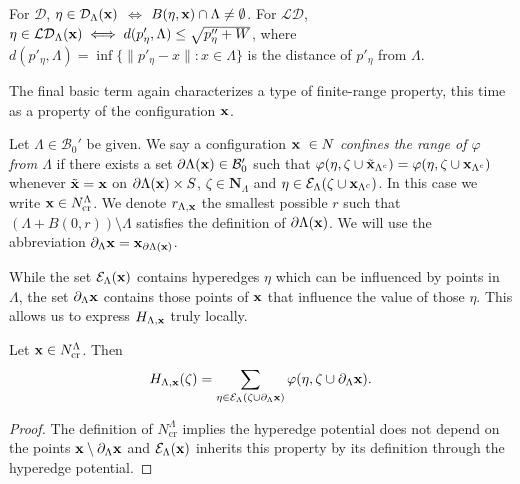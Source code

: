 
\begin{remark}
For $\mathcal D$, $\eta \in \mathcal D_\Lambda({\mathbf{x}})$ $\iff$ $B(\eta,{\mathbf{x}}) \cap \Lambda \neq \emptyset$. \newline
For $\mathcal {LD}$, $\eta \in \mathcal {LD}_\Lambda({\mathbf{x}}) \iff d(p'_\eta,\Lambda) \leq \sqrt{p''_\eta + W}$, where $d(p'_\eta,\Lambda) = \inf\{\|p'_\eta - x\|: x \in \Lambda\}$ is the distance of $p'_\eta$ from $\Lambda$.    \newline
\end{remark}

The final basic term again characterizes a type of finite-range property, this time as a property of the configuration ${\mathbf{x}}$.

\begin{definition}\label{def:cr}
	Let $\Lambda \in \mathcal B_0'$ be given. We say a configuration ${\mathbf{x}}\ \in N$ \textit{confines the range of $\varphi$ from $\Lambda$} if there exists a set $\partial \Lambda({\mathbf{x}}) \in \mathcal B_0'$ such that $\varphi(\eta,\zeta \cup \tilde{{\mathbf{x}}}_{\Lambda^c}) = \varphi(\eta,\zeta\cup{\mathbf{x}}_{\Lambda^c})$ whenever $\tilde{{\mathbf{x}}} = {\mathbf{x}}$ on $\partial \Lambda({\mathbf{x}})\times S$, $\zeta \in \mathbf N_\Lambda$ and $\eta \in \mathcal E_\Lambda(\zeta\cup{\mathbf{x}}_{\Lambda^c})$. In this case we write ${\mathbf{x}} \in N^\Lambda_\mathrm{cr}$. We denote $r_{\Lambda,{\mathbf{x}}}$ the smallest possible $r$ such that $(\Lambda + B(0,r))\setminus \Lambda$ satisfies the definition of $\partial \Lambda({\mathbf{x}})$. We will use the abbreviation $\partial_\Lambda {\mathbf{x}} = {\mathbf{x}}_{\partial \Lambda({\mathbf{x}})}$.
\end{definition}

While the set $\mathcal E_\Lambda({\mathbf{x}})$ contains hyperedges $\eta$ which can be influenced by points in $\Lambda$, the set $\partial_\Lambda {\mathbf{x}}$  contains those points of ${\mathbf{x}}$ that influence the value of those $\eta$. This allows us to express $H_{\Lambda,{\mathbf{x}}}$ truly locally.

\begin{proposition}\label{prop:Hcr}Let ${\mathbf{x}}\in N^\Lambda_\mathrm{cr}$. Then 
	$$H_{\Lambda,{\mathbf{x}}}(\zeta) = \sum_{\eta \in \mathcal E_\Lambda(\zeta \cup \partial_\Lambda {\mathbf{x}})} \varphi(\eta, \zeta \cup \partial_\Lambda {\mathbf{x}}).$$
\end{proposition}
\begin{proof} The definition of $N^\Lambda_\mathrm{cr}$ implies the hyperedge potential does not depend on the points ${\mathbf{x}} \setminus \partial_\Lambda {\mathbf{x}}$ and $\mathcal E_\Lambda({\mathbf{x}})$ inherits this property by its definition through the hyperedge potential.
\end{proof}



